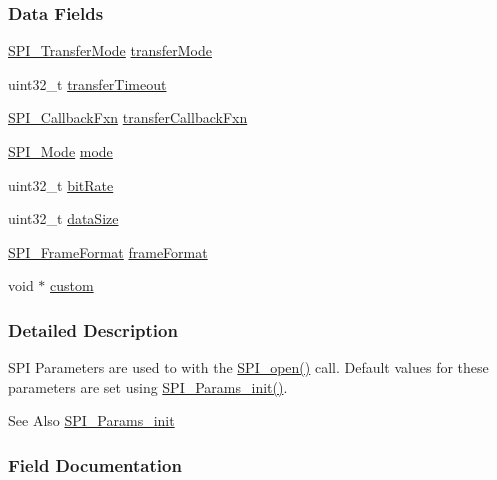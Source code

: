 \subsubsection*{Data Fields}
\begin{DoxyCompactItemize}
\item 
\hyperlink{_s_p_i_8h_ab9ea76c6529d6076eee5e1c4a5a92c6f}{S\-P\-I\-\_\-\-Transfer\-Mode} \hyperlink{struct_s_p_i___params_a16dbcc3768a01fb7deae25b48fc0d69c}{transfer\-Mode}
\item 
uint32\-\_\-t \hyperlink{struct_s_p_i___params_a600801907cf396a96825eaf69781913a}{transfer\-Timeout}
\item 
\hyperlink{_s_p_i_8h_aeb03e7608a14021c3b0acf92c90e2168}{S\-P\-I\-\_\-\-Callback\-Fxn} \hyperlink{struct_s_p_i___params_a68d1d610da6a6bf299121b939ef2a352}{transfer\-Callback\-Fxn}
\item 
\hyperlink{_s_p_i_8h_a60a7e3d74577b38aa79ea6983362f942}{S\-P\-I\-\_\-\-Mode} \hyperlink{struct_s_p_i___params_abe5eca64adf4ca96bed206a271d9b157}{mode}
\item 
uint32\-\_\-t \hyperlink{struct_s_p_i___params_ab3f035044fdbe75adac8c1d729d8cf20}{bit\-Rate}
\item 
uint32\-\_\-t \hyperlink{struct_s_p_i___params_a30722b1de5e3b089ecf0c669da42ed2d}{data\-Size}
\item 
\hyperlink{_s_p_i_8h_a4e1f33555dfa8147205af5b266f3a489}{S\-P\-I\-\_\-\-Frame\-Format} \hyperlink{struct_s_p_i___params_a67b5ebb8ec72796a0260c427c91cc093}{frame\-Format}
\item 
void $\ast$ \hyperlink{struct_s_p_i___params_a909f58a310514d16b4fee1b51033d976}{custom}
\end{DoxyCompactItemize}


\subsubsection{Detailed Description}
S\-P\-I Parameters are used to with the \hyperlink{_s_p_i_8h_a62cfe494cb1df47cd602e8747e894fd1}{S\-P\-I\-\_\-open()} call. Default values for these parameters are set using \hyperlink{_s_p_i_8h_a9c3dd1748332fd6e31c79a6538a71642}{S\-P\-I\-\_\-\-Params\-\_\-init()}. 

\begin{DoxySeeAlso}{See Also}
\hyperlink{_s_p_i_8h_a9c3dd1748332fd6e31c79a6538a71642}{S\-P\-I\-\_\-\-Params\-\_\-init} 
\end{DoxySeeAlso}


\subsubsection{Field Documentation}
